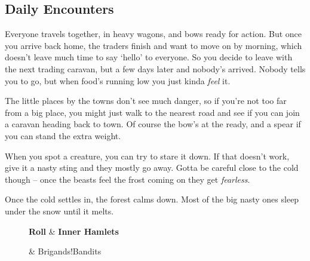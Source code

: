 \begin{multicols}{2}

\subsection{Daily Encounters}

\begin{speechtext}
  Everyone travels together, in heavy wagons, and bows ready for action.
  But once you arrive back home, the traders finish and want to move on by morning, which doesn't leave much time to say `hello' to everyone.
  So you decide to leave with the next trading caravan, but a few days later and nobody's arrived.
  Nobody tells you to go, but when food's running low you just kinda \emph{feel} it.

  The little places by the towns don't see much danger, so if you're not too far from a big place, you might just walk to the nearest road and see if you can join a caravan heading back to town.
  Of course the bow's at the ready, and a spear if you can stand the extra weight.

  When you spot a creature, you can try to stare it down.
  If that doesn't work, give it a nasty sting and they mostly go away.
  Gotta be careful close to the cold though -- once the beasts feel the frost coming on they get \emph{fearless}.

  Once the cold settles in, the forest calms down.
  Most of the big nasty ones sleep under the snow until it melts.
\end{speechtext}


\begin{figure*}[b!]

\begin{multicols}{3}
\small
\setcounter{enc}{15}
\setcounter{diceNo}{13}
\vspace{2em}
\noindent
\begin{boxtable}[c|L]
  \hline
  \hline
  \textbf{Roll} & \textbf{Inner Hamlets} \\
  \hline
  \hline
  \addtocounter{diceNo}{-1}
  \addtocounter{enc}{-1}
   & \ifodd\value{enc}Brigands!\else Bandits\fi \\
  \hline
  \hline
\end{boxtable}


\end{multicols}
\end{figure*}
\end{multicols}
